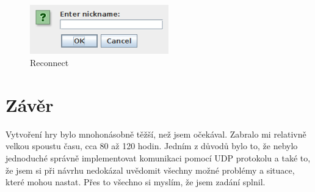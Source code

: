 \documentclass[12pt, a4paper]{article}
\begin{document}
	\begin{figure}[ht!]
		\centering
		\caption{Reconnect}
		\label{Reconnect}
		\includegraphics[width=6cm]{img/Reconnect.png}
	\end{figure}
	
	\section{Závěr}
	Vytvoření hry bylo mnohonásobně těžší, než jsem očekával. Zabralo mi relativně velkou spoustu času, cca 80 až 120 hodin. Jedním z důvodů bylo to, že nebylo jednoduché správně implementovat komunikaci pomocí UDP protokolu a také to, že jsem si při návrhu nedokázal uvědomit všechny možné problémy a situace, které mohou nastat. Přes to všechno si myslím, že jsem zadání splnil.
	
\end{document}
